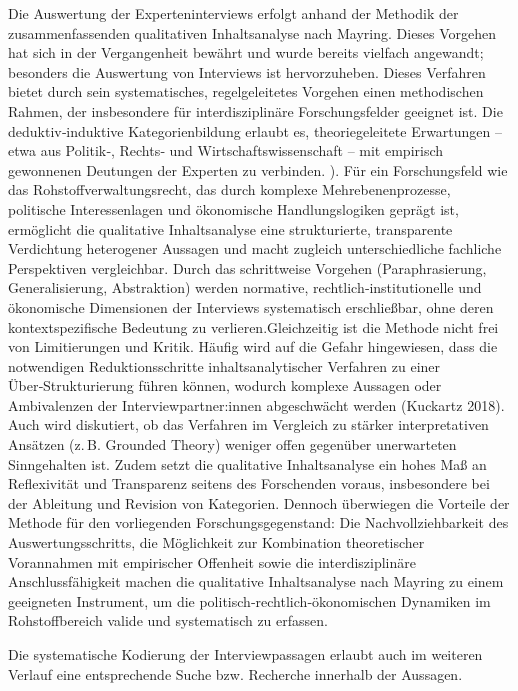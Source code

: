 \documentclass[12pt,a4paper,oneside]{book} %
\begin{document}
Die Auswertung der Experteninterviews erfolgt anhand der Methodik der zusammenfassenden qualitativen Inhaltsanalyse nach Mayring. Dieses Vorgehen hat sich in der Vergangenheit bewährt und wurde bereits vielfach angewandt; besonders die Auswertung von Interviews ist hervorzuheben. Dieses Verfahren bietet durch sein systematisches, regelgeleitetes Vorgehen einen methodischen Rahmen, der insbesondere für interdisziplinäre Forschungsfelder geeignet ist. Die deduktiv‑induktive Kategorienbildung erlaubt es, theoriegeleitete Erwartungen – etwa aus Politik‑, Rechts‑ und Wirtschaftswissenschaft – mit empirisch gewonnenen Deutungen der Experten zu verbinden. ). Für ein Forschungsfeld wie das Rohstoffverwaltungsrecht, das durch komplexe Mehrebenenprozesse, politische Interessenlagen und ökonomische Handlungslogiken geprägt ist, ermöglicht die qualitative Inhaltsanalyse eine strukturierte, transparente Verdichtung heterogener Aussagen und macht zugleich unterschiedliche fachliche Perspektiven vergleichbar. Durch das schrittweise Vorgehen (Paraphrasierung, Generalisierung, Abstraktion) werden normative, rechtlich‑institutionelle und ökonomische Dimensionen der Interviews systematisch erschließbar, ohne deren kontextspezifische Bedeutung zu verlieren.Gleichzeitig ist die Methode nicht frei von Limitierungen und Kritik. Häufig wird auf die Gefahr hingewiesen, dass die notwendigen Reduktionsschritte inhaltsanalytischer Verfahren zu einer Über‑Strukturierung führen können, wodurch komplexe Aussagen oder Ambivalenzen der Interviewpartner:innen abgeschwächt werden (Kuckartz 2018). Auch wird diskutiert, ob das Verfahren im Vergleich zu stärker interpretativen Ansätzen (z. B. Grounded Theory) weniger offen gegenüber unerwarteten Sinngehalten ist. Zudem setzt die qualitative Inhaltsanalyse ein hohes Maß an Reflexivität und Transparenz seitens des Forschenden voraus, insbesondere bei der Ableitung und Revision von Kategorien. Dennoch überwiegen die Vorteile der Methode für den vorliegenden Forschungsgegenstand: Die Nachvollziehbarkeit des Auswertungsschritts, die Möglichkeit zur Kombination theoretischer Vorannahmen mit empirischer Offenheit sowie die interdisziplinäre Anschlussfähigkeit machen die qualitative Inhaltsanalyse nach Mayring zu einem geeigneten Instrument, um die politisch‑rechtlich‑ökonomischen Dynamiken im Rohstoffbereich valide und systematisch zu erfassen.

Die systematische Kodierung der Interviewpassagen erlaubt auch im weiteren Verlauf eine entsprechende Suche bzw. Recherche innerhalb der Aussagen.
\end{document}

